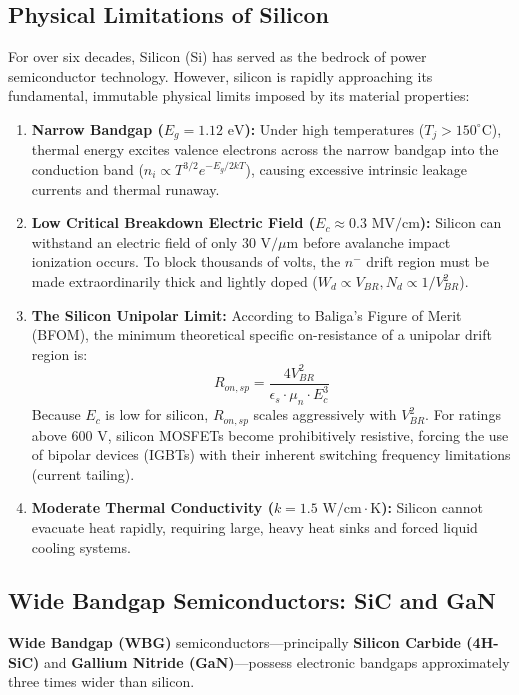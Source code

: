 \documentclass[11pt,a4paper]{article}
\begin{document}
\subsection{Physical Limitations of Silicon}

For over six decades, Silicon (Si) has served as the bedrock of power semiconductor technology. However, silicon is rapidly approaching its fundamental, immutable physical limits imposed by its material properties:
\begin{enumerate}[leftmargin=*]
  \item \textbf{Narrow Bandgap ($E_g = 1.12\text{ eV}$):} Under high temperatures ($T_j > 150^\circ\text{C}$), thermal energy excites valence electrons across the narrow bandgap into the conduction band ($n_i \propto T^{3/2} e^{-E_g / 2 k T}$), causing excessive intrinsic leakage currents and thermal runaway.
  \item \textbf{Low Critical Breakdown Electric Field ($E_c \approx 0.3\text{ MV/cm}$):} Silicon can withstand an electric field of only $30\text{ V}/\mu\text{m}$ before avalanche impact ionization occurs. To block thousands of volts, the $n^-$ drift region must be made extraordinarily thick and lightly doped ($W_d \propto V_{BR}, N_d \propto 1/V_{BR}^2$).
  \item \textbf{The Silicon Unipolar Limit:}
    According to Baliga's Figure of Merit (BFOM), the minimum theoretical specific on-resistance of a unipolar drift region is:
    \begin{equation}
    R_{on,sp} = \frac{4 V_{BR}^2}{\epsilon_s \cdot \mu_n \cdot E_c^3}
    \end{equation}
    Because $E_c$ is low for silicon, $R_{on,sp}$ scales aggressively with $V_{BR}^2$. For ratings above $600\text{ V}$, silicon MOSFETs become prohibitively resistive, forcing the use of bipolar devices (IGBTs) with their inherent switching frequency limitations (current tailing).
  \item \textbf{Moderate Thermal Conductivity ($k = 1.5\text{ W/cm}\cdot\text{K}$):} Silicon cannot evacuate heat rapidly, requiring large, heavy heat sinks and forced liquid cooling systems.
\end{enumerate}

\subsection{Wide Bandgap Semiconductors: SiC and GaN}

\textbf{Wide Bandgap (WBG)} semiconductors—principally \textbf{Silicon Carbide (4H-SiC)} and \textbf{Gallium Nitride (GaN)}—possess electronic bandgaps approximately three times wider than silicon.
\end{document}
